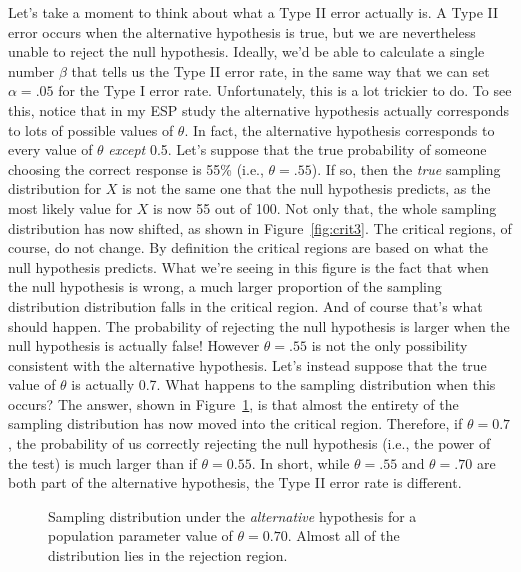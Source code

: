 Let's take a moment to think about what a Type II error actually is. A Type II error occurs when the alternative hypothesis is true, but we are nevertheless unable to reject the null hypothesis. Ideally, we'd be able to calculate a single number $\beta$ that tells us the Type II error rate, in the same way that we can set $\alpha = .05$ for the Type I error rate. Unfortunately, this is a lot trickier to do. To see this, notice that in my ESP study the alternative hypothesis actually corresponds to lots of possible values of $\theta$. In fact, the alternative hypothesis corresponds to every value of $\theta$ {\it except} 0.5. Let's suppose that the true probability of someone choosing the correct response is 55\% (i.e., $\theta = .55$). If so, then the {\it true} sampling distribution for $X$ is not the same one that the null hypothesis predicts, as the most likely value for $X$ is now 55 out of 100. Not only that, the whole sampling distribution has now shifted, as shown in Figure~\ref{fig:crit3}. The critical regions, of course, do not change. By definition the critical regions are based on what the null hypothesis predicts. What we're seeing in this figure is the fact that when the null hypothesis is wrong, a much larger proportion of the sampling distribution distribution falls in the critical region. And of course that's what should happen. The probability of rejecting the null hypothesis is larger when the null hypothesis is actually false!  However $\theta = .55$ is not the only possibility consistent with the alternative hypothesis. Let's instead suppose that the true value of $\theta$ is actually 0.7. What happens to the sampling distribution when this occurs? The answer, shown in Figure~\ref{fig:crit4}, is that almost the entirety of the sampling distribution has now moved into the critical region. Therefore, if $\theta = 0.7$, the probability of us correctly rejecting the null hypothesis (i.e., the power of the test) is much larger than if $\theta = 0.55$. In short, while $\theta = .55$ and $\theta = .70$ are both part of the alternative hypothesis, the Type II error rate is different.

\begin{figure}[htb]
\begin{center}
\caption{Sampling distribution under the {\it alternative} hypothesis for a population parameter value of $\theta = 0.70$. Almost all of the distribution lies in the rejection region.}
\HR
\label{fig:crit4}
\end{center}
\end{figure}

